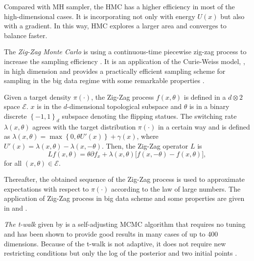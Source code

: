 Compared with MH sampler, the HMC has a higher efficiency in most of the high-dimensional cases. It is incorporating not only with energy $U(x)$ but also with a gradient. In this way, HMC explores a larger area and converges to balance faster. 


The \textit{Zig-Zag Monte Carlo} is using a continuous-time piecewise zig-zag process to increase the sampling efficiency \cite{bierkens2016piecewise}. It is an application of the Curie-Weiss model, \cite{turitsyn2011irreversible}, in high dimension and provides a practically efficient sampling scheme for sampling in the big data regime with some remarkable properties \cite{bierkens2017limit}. 

Given a target density $\pi(\cdot)$, the Zig-Zag process $f(x,\theta)$ is defined in a $d \otimes 2$ space $\mathcal{E}$. $x$ is in the $d$-dimensional topological subspace and $\theta$ is in a binary discrete $\left\lbrace -1,1\right\rbrace_d$ subspace denoting the flipping statues. The switching rate $\lambda(x,\theta)$ agrees with the target distribution $\pi(\cdot)$ in a certain way and is defined as $\lambda(x,\theta) = \max \left\lbrace 0,\theta U'(x) \right\rbrace +\gamma(x)$, where $U'(x)  = \lambda(x,\theta) - \lambda(x,-\theta)$. Then, the Zig-Zag operator $L$ is 
\begin{equation*}
Lf(x,\theta)=\theta\partial f_x+\lambda(x,\theta)\lbrack f(x,-\theta)-f(x,\theta )\rbrack,
\end{equation*}
for all $(x,\theta)\in \mathcal{E}$. 

Thereafter, the obtained sequence of the Zig-Zag process is used to approximate expectations with respect to $\pi(\cdot)$ according to the law of large numbers. 
The application of Zig-Zag process in big data scheme and some properties are given in \cite{bierkens2017limit} and \cite{bierkens2016zig}.




\textit{The t-walk} given by \cite{christen2010general} is a self-adjusting MCMC algorithm that requires no tuning and has been shown to provide good results in many cases of up to 400 dimensions. Because of the t-walk is not adaptive, it does not require new restricting conditions but only the log of the posterior and two initial points \cite{blaauw2011flexible}. 

